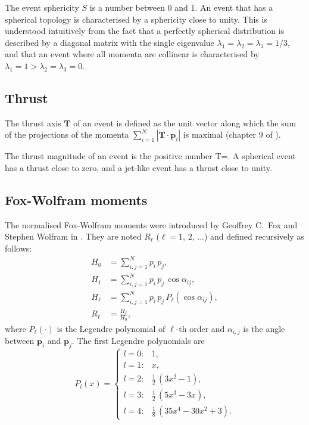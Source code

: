 The event sphericity $S$ is a number between 0 and 1.
An event that has a spherical topology is characterised by a sphericity close to unity.
This is understood intuitively from the fact that a perfectly spherical distribution is described by a diagonal matrix with the single eigenvalue $\lambda_1=\lambda_2=\lambda_3=1/3$, and that an event where all momenta are collinear is characterised by $\lambda_1=1>\lambda_2=\lambda_3=0$.

\subsection{Thrust} \label{sec:thrust}
The thrust axis $\mathbf{T}$ of an event is defined as the unit vector along which the sum of the projections of the momenta $\sum_{i=1}^{N} |\mathbf{T}\cdot\mathbf{p}_i|$ is maximal (chapter 9 of \autocite{BaBar:2014omp}).

The thrust magnitude of an event is the positive number
\be
T=.
\ee
A spherical event has a thrust close to zero, and a jet-like event has a thrust close to unity. 
\subsection{Fox-Wolfram moments} \label{sec:da_fw}
The normalised Fox-Wolfram moments were introduced by Geoffrey C.~Fox and Stephen Wolfram in \cite{Fox:1978vu, Fox:1978vw}. They are noted $R_\ell$ ($\ell=1,\,2,\,...$) and defined recursively as follows:
\begin{align}
H_0&=\sum_{i,j=1}^{N}p_i\,p_j,\\
H_1&=\sum_{i,j=1}^{N}p_i\,p_j\,\cos\alpha_{ij},\\
H_\ell&=\sum_{i,j=1}^{N}p_i\,p_j\,P_\ell\left(\cos\alpha_{ij}\right),\\
R_\ell&=\frac{H_\ell}{H_0},
\end{align}
where $P_\ell(\cdot)$ is the Legendre polynomial of $\ell$-th order and $\alpha_{i,j}$ is the angle between $\mathbf{p}_i$ and $\mathbf{p}_j$.
The first Legendre polynomials are
\begin{equation} \label{eq:legendre}
  P_l(x) = \left\{\begin{array}{ll}
  l = 0: & 1, \\
  l = 1: & x, \\
  l = 2: & \frac{1}{2}\,(3x^2-1), \\
  l = 3: & \frac{1}{2}\,(5x^3-3x), \\
  l = 4: & \frac{1}{8}\,(35x^4-30x^2+3).
  \end{array}
  \right.
\end{equation}
